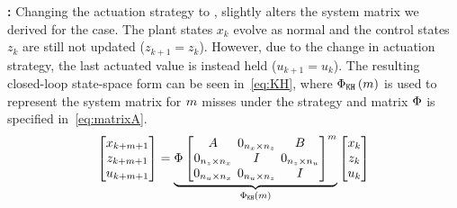 \textbf{\tKH{}: }%
%
Changing the actuation strategy to \tH{}, slightly alters the system matrix we derived for the \tKZ{} case.
The plant states $x_k$ evolve as normal and the control states $z_k$ are still not updated ($z_{k+1} = z_k$).
However, due to the change in actuation strategy, the last actuated value is instead held ($u_{k+1} = u_k$).
The resulting closed-loop state-space form can be seen in~\eqref{eq:KH}, where $\Phi{}_{\texttt{K}\texttt{H}}\left( m \right)$ is used to represent the system matrix for $m$ misses under the \tKH{} strategy and matrix $\Phi{}$ is specified in~\eqref{eq:matrixA}.
%
\begin{equation}
    \setlength\arraycolsep{2pt}
    \label{eq:KH}
    \begin{bmatrix}
        x_{k+\nummisses+1} \\
        z_{k+\nummisses+1} \\
        u_{k+\nummisses+1}
    \end{bmatrix} = 
    \underbrace{ \clmat{} \begin{bmatrix}
        \Ap                                         & 0_{n_x \times n_z}  & \Bp \\
        0_{n_z \times n_x}    & I                                         & 0_{n_z \times n_u} \\
        0_{n_u \times n_x}   & 0_{n_u \times n_z}   & I
    \end{bmatrix}^{\nummisses}}_{\clmat{}_{\Kill\Hold}\funof{\nummisses}}
    \begin{bmatrix}
        x_{k} \\
        z_{k} \\
        u_{k}
    \end{bmatrix}
\end{equation}

